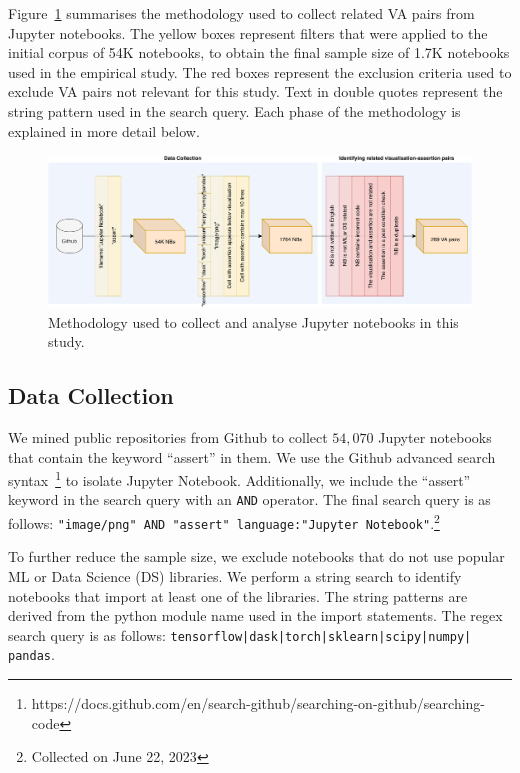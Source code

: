 \documentclass[conference]{IEEEtran}
\begin{document}
Figure~\ref{fig:method} summarises the methodology used to collect related VA pairs from Jupyter notebooks. The yellow boxes represent filters that were applied to the initial corpus of 54K notebooks, to obtain the final sample size of 1.7K notebooks used in the empirical study. The red boxes represent the exclusion criteria used to exclude VA pairs not relevant for this study. Text in double quotes represent the string pattern used in the search query. Each phase of the methodology is explained in more detail below.

\begin{figure}
  \centering
  \includegraphics[width=\textwidth]{method.pdf}
  \caption{Methodology used to collect and analyse Jupyter notebooks
    in this study.}
  \label{fig:method}
\end{figure}

\subsection{Data Collection}\label{sec:data-collect}

We mined public repositories from Github to collect $54,070$ Jupyter notebooks that contain the keyword ``assert'' in them. We use the Github advanced search syntax~\footnote{https://docs.github.com/en/search-github/searching-on-github/searching-code} to isolate Jupyter Notebook. Additionally, we include the ``assert'' keyword in the search query with an \texttt{AND} operator. The final search query is as follows: \texttt{"image/png" AND "assert" language:"Jupyter Notebook"}.\footnote{Collected on June 22, 2023}

To further reduce the sample size, we exclude notebooks that do not use popular ML or Data Science (DS) libraries. We perform a string search to identify notebooks that import at least one of the libraries. The string patterns are derived from the python module name used in the import statements. The regex search query is as follows: \texttt{tensorflow|dask|torch|sklearn|scipy|numpy| pandas}.
\end{document}
